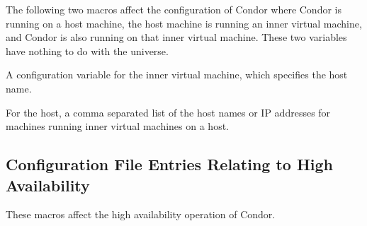The following two macros affect the configuration of Condor where Condor is
running on a host machine, the host machine is running an
inner virtual machine,
and Condor is also running on that inner virtual machine.
These two variables have nothing to do with the 
universe.

\begin{description}
\label{param:VMPHostMachine}
\item[\Macro{VMP\_HOST\_MACHINE}]
  A configuration variable for the inner virtual machine,
  which specifies the host name.

\label{param:VMPVMList}
\item[\Macro{VMP\_VM\_LIST}]
  For the host, 
  a comma separated list of the host names or IP addresses
  for machines running inner virtual machines on a host.
\end{description}

\subsection{\label{sec:HA-Config-File-Entries}Configuration File Entries
Relating to High Availability}

These macros affect the high availability operation of Condor.

